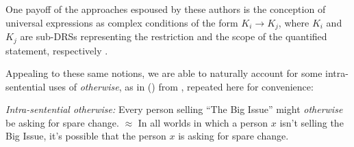 One payoff of the approaches espoused by these authors is the conception of universal expressions as complex conditions of the form $K_i \rightarrow K_j$, where $K_i$ and $K_j$ are sub-DRSs representing the restriction and the scope of the quantified statement, respectively \citep[693-4]{Roberts1989}. 

Appealing to these same notions, we are able to naturally account for some intra-sentential uses of \textit{otherwise}, as in (\nextx) from \citealp[7]{Webber2001}, repeated here for convenience:


\pex  \label{bigissue-rpt} \textit{Intra-sentential \emph{otherwise}:}\label{intra-adv}
\a  Every person selling ``The Big Issue'' might \textit{otherwise} be asking for spare change. \trailingcitation{=(\ref{bigissue})}
%
%
\a  {}
\a  $\approx$ In all worlds in which a person $x$ isn't selling the Big Issue, it's possible that the person $x$ is asking for spare change. \xe
%
%
%		



